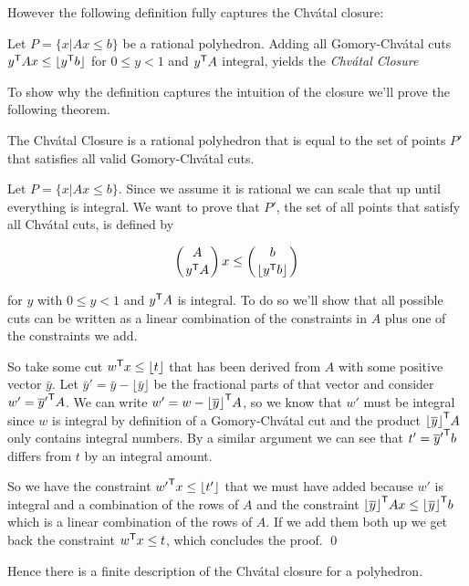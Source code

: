 However the following definition fully captures the Chv\'atal closure:

\begin{Def} Let $P=\{x|Ax\leq b\}$ be a rational polyhedron. Adding all Gomory-Chv\'{a}tal cuts ${y}^\text{\upshape \sffamily T}Ax\leq \lfloor {y}^\text{\upshape \sffamily T} b\rfloor$ for $0\leq y < 1$ and ${y}^\text{\upshape \sffamily T} A$ integral, yields the \emph{Chv\'{a}tal Closure}
\end{Def}

To show why the definition captures the intuition of the closure we'll prove the following theorem.

\begin{thm} The Chv\'{a}tal Closure is a rational polyhedron that is equal to the set of points $P'$ that satisfies all valid Gomory-Chv\'atal cuts.\end{thm}

\begin{pr} Let $P=\{x|Ax\leq b\}$. Since we assume it is rational we can scale that up until everything is integral. We want to prove that $P'$, the set of all points that satisfy all Chv\'atal cuts, is defined by

\[\left({A}\atop{{y}^\text{\upshape \sffamily T} A}\right) x \leq \left({b}\atop {\lfloor {y}^\text{\upshape \sffamily T} b\rfloor}\right)\]

for $y$ with $0\leq y < 1$ and ${y}^\text{\upshape \sffamily T} A$ is integral. To do so we'll show that all possible cuts can be written as a linear combination of the constraints in $A$ plus one of the constraints we add.

So take some cut ${w}^\text{\upshape \sffamily T} x \leq \lfloor t\rfloor$ that has been derived from $A$ with some positive vector $\bar y$. Let $\bar y'= \bar y - \lfloor \bar y\rfloor$ be the fractional parts of that vector and consider $w'={\overline y'}^\text{\upshape \sffamily T}A$. We can write $w'=w-{\lfloor \overline y \rfloor}^\text{\upshape \sffamily T}A$, so we know that $w'$ must be integral since $w$ is integral by definition of a Gomory-Chv\'atal cut and the product ${\lfloor \overline y \rfloor}^\text{\upshape \sffamily T}A$ only contains integral numbers. By a similar argument we can see that $t' = {\overline y'}^\text{\upshape \sffamily T}b$ differs from $t$ by an integral amount.

So we have the constraint ${w'}^\text{\upshape \sffamily T}x\leq \lfloor t'\rfloor$ that we must have added because $w'$ is integral and a combination of the rows of $A$ and the constraint ${\lfloor \overline y \rfloor}^\text{\upshape \sffamily T} Ax\leq {\lfloor \overline y\rfloor}^\text{\upshape \sffamily T} b$ which is a linear combination of the rows of $A$. If we add them both up we get back the constraint ${w}^\text{\upshape \sffamily T} x\leq t$, which concludes the proof.
\qed \end{pr}

Hence there is a finite description of the Chv\'atal closure for a polyhedron.
